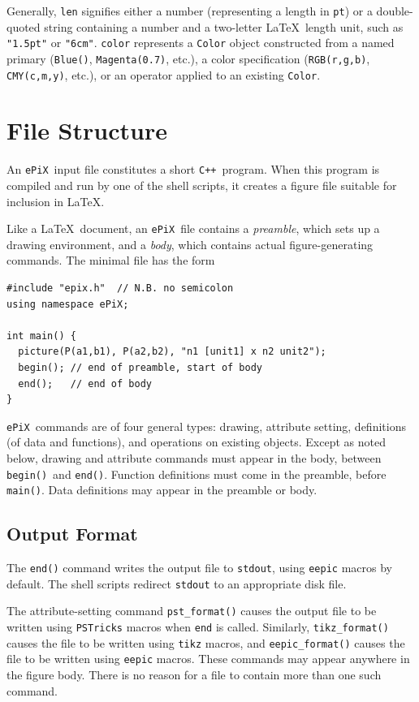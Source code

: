 \documentclass[12pt,letterpaper]{book}
\newcommand{\code}[1]{\texttt{#1}}
\newcommand{\ePiX}{\code{ePiX}}
\newcommand{\CXX}{\code{C++}}
\newcommand{\findex}[1]{\ignorespaces}
\begin{document}
%
%
Generally, \code{len} signifies either a number (representing a length
in \code{pt}) or a double-quoted string containing a number and a
two-letter \LaTeX\ length unit, such as \code{"1.5pt"} or
\code{"6cm"}. \code{color} represents a \code{Color} object
constructed from a named primary (\code{Blue()}, \code{Magenta(0.7)},
etc.), a color specification (\code{RGB(r,g,b)}, \code{CMY(c,m,y)},
etc.), or an operator applied to an existing \code{Color}.


\section{File Structure}

An \ePiX\ input file constitutes a short \CXX\ program. When this
program is compiled and run by one of the shell scripts, it creates a
figure file suitable for inclusion in \LaTeX.

Like a \LaTeX\ document, an \ePiX\ file contains a \emph{preamble},
which sets up a drawing environment, and a \emph{body}, which contains
actual figure-generating commands.  The minimal file has the form
\findex{picture}
\findex{begin}
\findex{end}
\begin{verbatim}
#include "epix.h"  // N.B. no semicolon
using namespace ePiX;

int main() {
  picture(P(a1,b1), P(a2,b2), "n1 [unit1] x n2 unit2");
  begin(); // end of preamble, start of body
  end();   // end of body
}
\end{verbatim}
\ePiX\ commands are of four general types: drawing, attribute setting,
definitions (of data and functions), and operations on existing
objects. Except as noted below, drawing and attribute commands must
appear in the body, between \code{begin()}~and \code{end()}. Function
definitions must come in the preamble, before \code{main()}. Data
definitions may appear in the preamble or body.


\subsection*{Output Format}

The \code{end()} command writes the output file to \code{stdout},
using \code{eepic} macros by default. The shell scripts redirect
\code{stdout} to an appropriate disk file.

The attribute-setting command \code{pst\_format()} causes the output
file to be written using \code{PSTricks} macros when \code{end} is
called. Similarly, \code{tikz\_format()} causes the file to be written
using \code{tikz} macros, and \code{eepic\_format()} causes the file
to be written using \code{eepic} macros. These commands may appear
anywhere in the figure body. There is no reason for a file to contain
more than one such command.
\end{document}
